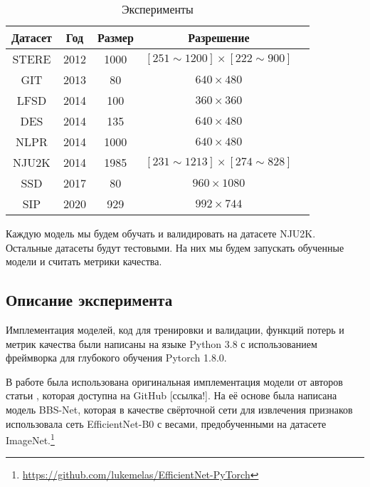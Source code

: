 \begin{center}
    \begin{table}
        \begin{tabular}{|c|c|c|c|c|} 
            \hline
            Датасет & Год & Размер & Разрешение\\
            \hline
            \hline
            STERE\cite{STERE} & 2012 & 1000 & $[251 \sim 1200] \times [222 \sim 900]$ \\
            \hline
            GIT\cite{GIT} & 2013 & 80 & $640 \times 480$ \\
            \hline
            LFSD\cite{LFSD} & 2014 & 100 & $360 \times 360$ \\
            \hline
            DES\cite{DES} & 2014 & 135 & $640 \times 480$  \\
            \hline
            NLPR\cite{NLPR} & 2014 & 1000 &  $640 \times 480$ \\
            \hline
            NJU2K\cite{NJU2K} & 2014 & 1985 & $[231 \sim 1213] \times [274 \sim 828]$\\
            \hline
            SSD\cite{SSD} & 2017 & 80 & $960 \times 1080$\\
            \hline
            SIP\cite{Rethinking-RGBD} & 2020 & 929 &  $992 \times 744$\\
            \hline
        \end{tabular}
    \caption{Эксперименты}
    \label{tab:datasets}
    \end{table}
\end{center}


Каждую модель мы будем обучать и валидировать на датасете NJU2K. Остальные датасеты будут тестовыми. На них мы будем
запускать обученные модели и считать метрики качества.

\subsection{Описание эксперимента}

Имплементация моделей, код для тренировки и валидации, функций потерь и метрик качества были написаны на языке Python 3.8
с использованием фреймворка для глубокого обучения Pytorch 1.8.0\cite{Pytorch}.

В работе была использована оригинальная имплементация модели от авторов статьи \cite{BBS}, которая доступна на GitHub [ссылка!].
На её основе была написана модель BBS-Net, которая в качестве свёрточной сети для извлечения признаков
использовала сеть EfficientNet-B0 \cite{Efficientnet} с весами, предобученными на датасете ImageNet.\footnote{\url{https://github.com/lukemelas/EfficientNet-PyTorch}} 


